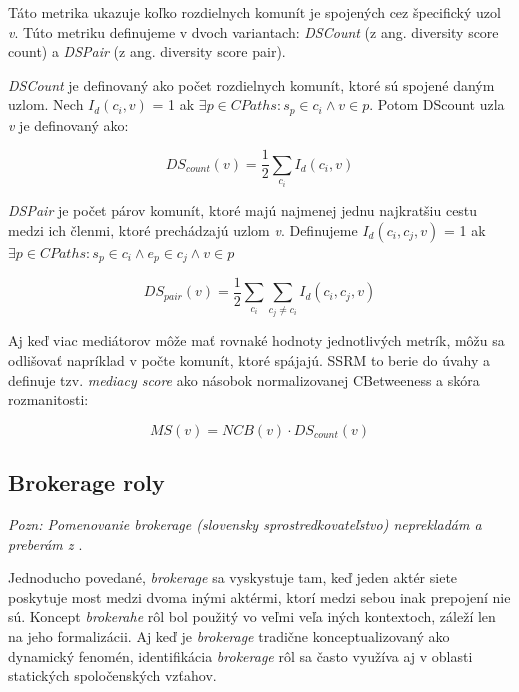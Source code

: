\documentclass[slovak,master,public,dept460,male,cpdeclaration,oneside]{diploma}
\begin{document}
\noindent Táto metrika ukazuje koľko rozdielnych komunít je spojených cez špecifický uzol \textit{v}. Túto metriku definujeme v dvoch variantach: \textit{DSCount} (z ang. diversity score count) a \textit{DSPair} (z ang. diversity score pair).



\begin{definition}
\textit{DSCount}  je definovaný ako počet rozdielnych komunít, ktoré sú spojené daným uzlom. Nech \textit{${I_d}({c_i}, v)$} = 1 ak \textit{${\exists p \in CPaths: {s_p} \in {c_i} \wedge	v \in p}$}. Potom DScount uzla \textit{v} je definovaný ako:

\begin{equation}
    DS_{count}(v) = \frac{1}{2}\sum_{c_{i}} I_{d}(c_{i},v)
\end{equation}
\end{definition}


\begin{definition}
\textit{DSPair} je počet párov komunít, ktoré majú najmenej jednu najkratšiu cestu medzi ich členmi, ktoré prechádzajú uzlom \textit{v}. \hfill \break
Definujeme  \textit{${I_d}({c_i},{c_j}, v)$} = 1 ak \textit{${\exists p \in CPaths: {s_p} \in {c_i} \wedge {e_p} \in {c_j} \wedge	v \in p}$}


\begin{equation}
   DS_{pair}(v) = \frac{1}{2}\sum_{c_{i}} \sum_{c_{j}\neq c_{i}} I_{d}(c_{i},c_{j},v)
\end{equation}
\end{definition}


Aj keď viac mediátorov môže mať rovnaké hodnoty jednotlivých metrík, 
môžu sa odlišovať napríklad v počte komunít, ktoré spájajú. SSRM to berie do úvahy a definuje tzv. \textit{mediacy score} ako násobok normalizovanej CBetweeness a skóra rozmanitosti:


\begin{equation}
 		MS(v) = NCB(v) \cdot DS_{count}(v) 
\end{equation}




\subsection{Brokerage roly}

\textit{Pozn: Pomenovanie \textit{brokerage} (slovensky sprostredkovateľstvo) neprekladám a preberám z \cite{15}}.

Jednoducho povedané, \textit{brokerage} sa vyskystuje tam, keď jeden aktér siete poskytuje most medzi dvoma inými aktérmi, ktorí medzi sebou inak prepojení nie sú. Koncept \textit{brokerahe} rôl bol použitý vo veľmi veľa iných kontextoch, záleží len na jeho formalizácii. Aj keď je \textit{brokerage} tradične konceptualizovaný ako dynamický fenomén, identifikácia \textit{brokerage} rôl sa často využíva aj v oblasti statických spoločenských vzťahov. 
\end{document}
